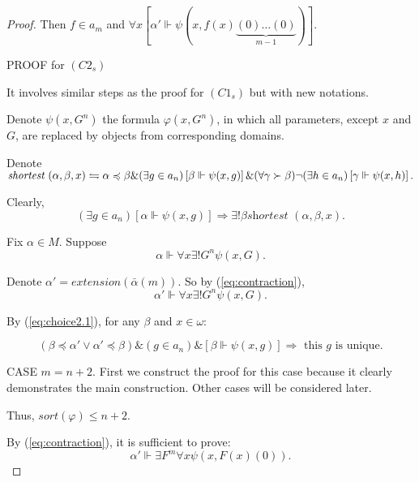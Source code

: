 \documentclass{asl}
\theoremstyle{definition}
\begin{document}
\begin{proof}
Then $f\in a_m$ and $\forall x[\alpha' \Vdash \psi(x,f(x)\underbrace{(0)\ldots(0)}_{m-1})] $.
\bigskip

\begin{center}
PROOF for $(C2_s)$
\end{center}

It involves similar steps as the proof for $(C1_s)$ but with new notations. 

Denote $\psi(x,G^n)$ the formula $\varphi(x,G^n)$, in which all parameters, except $x$ and $G$, are replaced by objects from corresponding domains. 
\medskip

Denote $\textit{shortest }(\alpha,\beta,x)\leftrightharpoons \\
\alpha\preccurlyeq \beta\& (\exists g\in a_n)\left[\beta\Vdash \psi(x,g)\right]  \& (\forall \gamma \succ\beta)\neg (\exists h\in a_n) \left[\gamma\Vdash \psi(x,h)\right].$

Clearly, 
\begin{equation}
(\exists g\in a_n) \left[\alpha\Vdash \psi(x,g)\right] \Rightarrow \exists! \beta \textit{shortest }(\alpha,\beta,x).
\label{eq:shortest2}
\end{equation}

Fix $\alpha\in M$. Suppose 
\[ \alpha\Vdash\forall x\exists! G^n\psi(x,G). \]

Denote $\alpha'=extension(\bar{\alpha}(m))$. So by (\ref{eq:contraction}),
\begin{equation}
 \alpha'\Vdash\forall x\exists! G^n\psi(x,G).  
\label{eq:choice2.1}
\end{equation}

By (\ref{eq:choice2.1}), for any $\beta$ and $x\in \omega$:

\begin{equation}
(\beta\preccurlyeq\alpha' \vee \alpha'\preccurlyeq \beta)\&(g\in a_n)\&\left[ \beta\Vdash \psi(x,g)\right] \Rightarrow \text{ this } g \text{ is unique}.
\label{eq:unique}
\end{equation}

CASE $m=n+2$. First we construct the proof for this case because it clearly demonstrates the main construction. Other cases will be considered later. 

Thus, $ sort(\varphi)\leqslant n+2$. 

By (\ref{eq:contraction}), it is sufficient to prove: 
\begin{equation}
\alpha'\Vdash \exists F^m\forall x\psi(x,F(x)(0)).
\label{eq:choice2.2}
\end{equation}


\end{proof}
\end{document}

